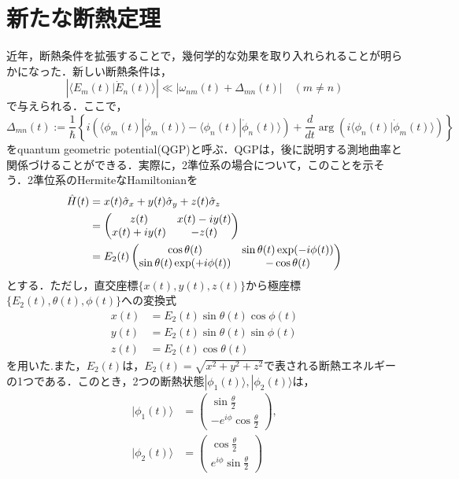 \documentclass[a4paper, titlepage]{jsreport}
\begin{document}
\section{新たな断熱定理}
近年，断熱条件を拡張することで，幾何学的な効果を取り入れられることが明らかになった\cite{Wu2008}．新しい断熱条件は，
\begin{equation}
  \left| \langle E_m(t) | \Dot{E}_n(t) \rangle \right| \ll \left| \omega_{nm}(t) + \Delta_{mn}(t) \right| \quad (m\ne n) 
\end{equation}
で与えられる．ここで，
\begin{equation}
  \Delta_{mn}(t) := \frac{1}{\hbar} \left\{ i \left( \langle \phi_m(t) | \Dot{\phi}_m(t) \rangle - \langle \phi_n(t) | \Dot{\phi}_n(t) \rangle \right)+ \frac{d}{dt} \arg \left( i \langle \phi_n(t) | \Dot{\phi}_m(t) \rangle \right) \right\}
\end{equation}
をquantum geometric potential(QGP)と呼ぶ．QGPは，後に説明する測地曲率と関係づけることができる．実際に，2準位系の場合について，このことを示そう．2準位系のHermiteなHamiltonianを
\begin{align}
  \Hat{H}(t)
  &= x(t)\Hat{\sigma}_x + y(t) \Hat{\sigma}_y + z(t) \Hat{\sigma}_z\\
  &=
  \begin{pmatrix} 
    z(t) & x(t) - iy(t)\\
    x(t) + iy(t) & -z(t)\\
  \end{pmatrix}\\
  &= E_2(t)
  \begin{pmatrix} 
    \cos \theta(t) & \sin \theta(t) \exp(-i\phi(t))\\
    \sin \theta(t) \exp(+i\phi(t)) & -\cos \theta(t)\\
  \end{pmatrix}
\end{align}
とする．ただし，直交座標$\{x(t), y(t), z(t)\}$から極座標$\{E_2(t), \theta(t), \phi(t)\}$への変換式
\begin{align}
  x(t) &= E_2(t) \sin \theta(t) \cos \phi(t)\\
  y(t) &= E_2(t) \sin \theta(t) \sin \phi(t)\\
  z(t) &= E_2(t) \cos \theta(t)
\end{align}
を用いた.また，$E_2(t)$は，$E_2(t) = \sqrt{x^2 + y^2 + z^2}$で表される断熱エネルギーの1つである．このとき，2つの断熱状態$|\phi_1(t) \rangle, |\phi_2(t) \rangle$は，
\begin{align}
  |\phi_1(t) \rangle
  &= 
  \begin{pmatrix}
    \sin \frac{\theta}{2}\\
    -e^{i\phi} \cos \frac{\theta}{2}
  \end{pmatrix},\\
  |\phi_2(t) \rangle
  &=
  \begin{pmatrix}
    \cos \frac{\theta}{2}\\
    e^{i\phi} \sin \frac{\theta}{2}
  \end{pmatrix}
\end{align}
\end{document}
